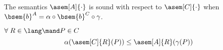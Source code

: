 
  \begin{theorem}[Soundness]

    The semantics $\asem[A]{\cdot}$ is sound with respect to $\asem[C]{\cdot}$
    when $\bsem{b}^A = \alpha \circ \bsem{b}^C \circ \gamma$.

    $\forall \; R \in \lang \mand P \in C$
    $$\alpha(\asem[C]{R}(P)) \leq \asem[A]{R}(\gamma(P))$$
  \end{theorem}
  
